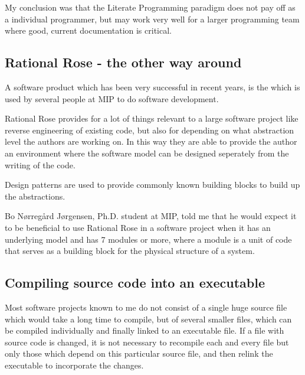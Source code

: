 My conclusion was that the Literate Programming paradigm does not pay
off as a individual programmer, but may work very well for a larger
programming team where good, current documentation is critical.

\subsection{Rational Rose - the other way around}
\label{sec:rational-rose}

A software product which has been very successful in recent years, is
the  which is used by several people at MIP to
do software development.

Rational Rose provides for a lot of things relevant to a large
software project like reverse engineering of existing code, but also
for
 depending on what abstraction level the
authors are working on.  In this way they are able to provide the
author an environment where the software model can be designed
seperately from the writing of the code.

Design patterns are used to provide commonly known building blocks to
build up the abstractions.

Bo N{\o}rreg{\aa}rd J{\o}rgensen, Ph.D. student at MIP, told
me that he would expect it to be beneficial to use Rational
Rose in a software project when it has an underlying model
and has 7 modules or more, where a module is a unit of code
that serves as a building block for the physical structure
of a system.
                       

\subsection{Compiling source code into an executable}
\label{sec:compiling-source-into-an-executable}

Most software projects known to me do not consist of a single huge
source file which would take a long time to compile, but of several smaller
files, which can be compiled individually and finally linked to an executable
file.  If a file with source code is changed, it is not necessary to
recompile each and every file but only those which depend on this
particular source file, and then relink the executable to incorporate
the changes.


